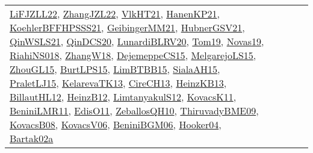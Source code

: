 {\begin{longtable}{lp{3cm}>{\raggedright}p{6cm}>{\raggedright}p{6cm}p{8cm}}
\href{papers/LiFJZLL22.pdf}{LiFJZLL22}\cite{LiFJZLL22}, \href{papers/ZhangJZL22.pdf}{ZhangJZL22}\cite{ZhangJZL22}, \href{articles/VlkHT21.pdf}{VlkHT21}\cite{VlkHT21}, \href{papers/HanenKP21.pdf}{HanenKP21}\cite{HanenKP21}, \href{articles/KoehlerBFFHPSSS21.pdf}{KoehlerBFFHPSSS21}\cite{KoehlerBFFHPSSS21}, \href{papers/GeibingerMM21.pdf}{GeibingerMM21}\cite{GeibingerMM21}, \href{articles/HubnerGSV21.pdf}{HubnerGSV21}\cite{HubnerGSV21}, \href{articles/QinWSLS21.pdf}{QinWSLS21}\cite{QinWSLS21}, \href{articles/QinDCS20.pdf}{QinDCS20}\cite{QinDCS20}, \href{articles/LunardiBLRV20.pdf}{LunardiBLRV20}\cite{LunardiBLRV20}, \href{papers/Tom19.pdf}{Tom19}\cite{Tom19}, \href{articles/Novas19.pdf}{Novas19}\cite{Novas19}, \href{papers/RiahiNS018.pdf}{RiahiNS018}\cite{RiahiNS018}, \href{articles/ZhangW18.pdf}{ZhangW18}\cite{ZhangW18}, \href{papers/DejemeppeCS15.pdf}{DejemeppeCS15}\cite{DejemeppeCS15}, \href{papers/MelgarejoLS15.pdf}{MelgarejoLS15}\cite{MelgarejoLS15}, \href{papers/ZhouGL15.pdf}{ZhouGL15}\cite{ZhouGL15}, \href{papers/BurtLPS15.pdf}{BurtLPS15}\cite{BurtLPS15}, \href{papers/LimBTBB15.pdf}{LimBTBB15}\cite{LimBTBB15}, \href{papers/SialaAH15.pdf}{SialaAH15}\cite{SialaAH15}, \href{papers/PraletLJ15.pdf}{PraletLJ15}\cite{PraletLJ15}, \href{papers/KelarevaTK13.pdf}{KelarevaTK13}\cite{KelarevaTK13}, \href{papers/CireCH13.pdf}{CireCH13}\cite{CireCH13}, \href{papers/HeinzKB13.pdf}{HeinzKB13}\cite{HeinzKB13}, \href{papers/BillautHL12.pdf}{BillautHL12}\cite{BillautHL12}, \href{papers/HeinzB12.pdf}{HeinzB12}\cite{HeinzB12}, \href{articles/LimtanyakulS12.pdf}{LimtanyakulS12}\cite{LimtanyakulS12}, \href{articles/KovacsK11.pdf}{KovacsK11}\cite{KovacsK11}, \href{articles/BeniniLMR11.pdf}{BeniniLMR11}\cite{BeniniLMR11}, \href{papers/EdisO11.pdf}{EdisO11}\cite{EdisO11}, \href{articles/ZeballosQH10.pdf}{ZeballosQH10}\cite{ZeballosQH10}, \href{papers/ThiruvadyBME09.pdf}{ThiruvadyBME09}\cite{ThiruvadyBME09}, \href{articles/KovacsB08.pdf}{KovacsB08}\cite{KovacsB08}, \href{papers/KovacsV06.pdf}{KovacsV06}\cite{KovacsV06}, \href{papers/BeniniBGM06.pdf}{BeniniBGM06}\cite{BeniniBGM06}, \href{papers/Hooker04.pdf}{Hooker04}\cite{Hooker04}, \href{papers/Bartak02a.pdf}{Bartak02a}\cite{Bartak02a}\\

\end{longtable}}
